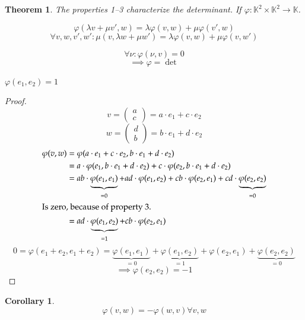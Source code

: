 \documentclass{article}
\newtheorem{theorem}{Theorem}  \numberwithin{theorem}{section}
\newtheorem*{corollary}{Corollary}%
\newcommand{\vectwo}[2]{\begin{pmatrix} #1 \\ #2 \end{pmatrix}}
\begin{document}
\begin{theorem} %
  The properties 1--3 characterize the determinant.
  If $\varphi: \mathbb K^2 \times \mathbb K^2 \to \mathbb K$.
  \begin{description}
    \item[bilinear\footnote{Bilinear means linear in both components}]
      \[ \varphi(\lambda v + \mu v', w) = \lambda \varphi(v, w) + \mu \varphi(v', w) \]
      \[ \forall v,w,v',w': \mu(v, \lambda w + \mu w') = \lambda \varphi(v, w) + \mu \varphi(v, w') \]
    \item \[ \forall \nu: \varphi(\nu, v) = 0 \]
      \[ \implies \varphi = \det{} \]
    \item $\varphi(e_1, e_2) = 1$
  \end{description}
\end{theorem}

\begin{proof}
  \[ v = \begin{pmatrix} a \\ c \end{pmatrix} = a \cdot e_1 + c \cdot e_2 \]
  \[ w = \vectwo db = b \cdot e_1 + d \cdot e_2 \]
  \begin{align*}
    \varphi(v, w) &= \varphi(a \cdot e_1 + c \cdot e_2, b \cdot e_1 + d \cdot e_2) \\
      &= a \cdot \varphi(e_1, b \cdot e_1 + d \cdot e_2) + c \cdot \varphi(e_2, b \cdot e_1 + d \cdot e_2) \\
      &= a b \cdot \underbrace{\varphi(e_1, e_1)}_{=0} + ad \cdot \varphi(e_1, e_2) + cb \cdot \varphi(e_2, e_1) + cd \cdot \underbrace{\varphi(e_2, e_2)}_{=0} \\
    \intertext{Is zero, because of property~3.}
      &= ad \cdot \underbrace{\varphi(e_1, e_2)}_{=1} + cb \cdot \varphi(e_2, e_1)
  \end{align*}
  \[ 0 = \varphi(e_1 + e_2, e_1 + e_2) = \underbrace{\varphi(e_1, e_1)}_{=0} + \underbrace{\varphi(e_1, e_2)}_{=1} + \varphi(e_2, e_1) + \underbrace{\varphi(e_2, e_2)}_{=0} \]
  \[ \implies \varphi(e_2, e_2) = -1 \]
\end{proof}

\begin{corollary} %
  \[ \varphi(v, w) = -\varphi(w, v) \forall v, w \]
\end{corollary}
\end{document}
